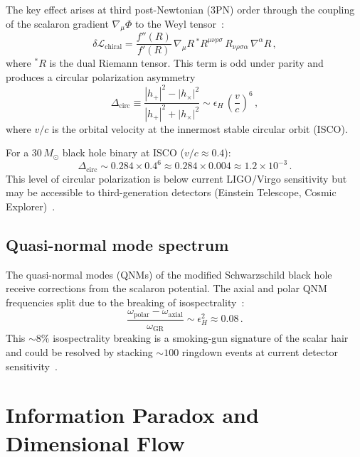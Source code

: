 \documentclass[amsmath,amssymb,aps,prd,twocolumn,superscriptaddress,nofootinbib]{revtex4-2}
\begin{document}
The key effect arises at third post-Newtonian (3PN) order through
the coupling of the scalaron gradient $\nabla_\mu\Phi$ to the
Weyl tensor~\cite{Nojiri2017}:
\begin{equation}
  \delta\mathcal{L}_{\mathrm{chiral}}
    = \frac{f''(R)}{f'(R)}\,\nabla_\mu R\,
      {}^*\!R^{\mu\nu\rho\sigma}\,R_{\nu\rho\sigma\alpha}\,
      \nabla^\alpha R\,,
  \label{eq:chiral_lagrangian}
\end{equation}
where ${}^*\!R$ is the dual Riemann tensor.  This term is odd
under parity and produces a circular polarization asymmetry
\begin{equation}
  \Delta_{\mathrm{circ}} \equiv
    \frac{|h_+|^2 - |h_\times|^2}{|h_+|^2 + |h_\times|^2}
    \sim \epsilon_H\,\left(\frac{v}{c}\right)^6\,,
  \label{eq:circular_pol}
\end{equation}
where $v/c$ is the orbital velocity at the innermost stable
circular orbit (ISCO).

For a $30\,M_\odot$ black hole binary at ISCO
($v/c \approx 0.4$):
\begin{equation}
  \Delta_{\mathrm{circ}}
    \sim 0.284 \times 0.4^6
    \approx 0.284 \times 0.004
    \approx 1.2 \times 10^{-3}\,.
  \label{eq:circ_numerical}
\end{equation}
This level of circular polarization is below current LIGO/Virgo
sensitivity but may be accessible to third-generation detectors
(Einstein Telescope, Cosmic Explorer)~\cite{Punturo2010,
Reitze2019}.

\subsection{Quasi-normal mode spectrum}

The quasi-normal modes (QNMs) of the modified Schwarzschild
black hole receive corrections from the scalaron potential.
The axial and polar QNM frequencies split due to the breaking
of isospectrality~\cite{Blazquez2018}:
\begin{equation}
  \frac{\omega_{\mathrm{polar}} - \omega_{\mathrm{axial}}}
       {\omega_{\mathrm{GR}}}
    \sim \epsilon_H^2 \approx 0.08\,.
  \label{eq:QNM_splitting}
\end{equation}
This $\sim 8\%$ isospectrality breaking is a smoking-gun
signature of the scalar hair and could be resolved by stacking
$\sim 100$ ringdown events at current detector
sensitivity~\cite{Isi2019}.

\section{Information Paradox and Dimensional Flow}
\label{sec:information}
\end{document}
